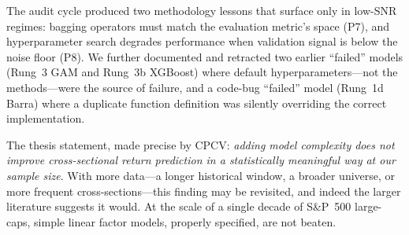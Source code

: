 \documentclass[11pt]{article}
\begin{document}
The audit cycle produced two methodology lessons that surface only
in low-SNR regimes: bagging operators must match the evaluation
metric's space (P7), and hyperparameter search degrades performance
when validation signal is below the noise floor (P8). We further
documented and retracted two earlier ``failed'' models (Rung~3 GAM
and Rung~3b XGBoost) where default hyperparameters---not the
methods---were the source of failure, and a code-bug ``failed'' model
(Rung~1d Barra) where a duplicate function definition was silently
overriding the correct implementation.

The thesis statement, made precise by CPCV: \emph{adding model
complexity does not improve cross-sectional return prediction in a
statistically meaningful way at our sample size}. With more data---a
longer historical window, a broader universe, or more frequent
cross-sections---this finding may be revisited, and indeed the larger
literature \citep{gu_kelly_xiu} suggests it would. At the scale of a
single decade of S\&P~500 large-caps, simple linear factor models,
properly specified, are not beaten.
\end{document}
